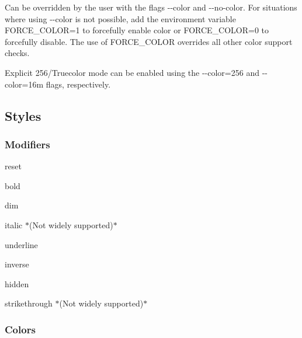 Can be overridden by the user with the flags {\ttfamily -\/-\/color} and {\ttfamily -\/-\/no-\/color}. For situations where using {\ttfamily -\/-\/color} is not possible, add the environment variable {\ttfamily F\+O\+R\+C\+E\+\_\+\+C\+O\+L\+OR=1} to forcefully enable color or {\ttfamily F\+O\+R\+C\+E\+\_\+\+C\+O\+L\+OR=0} to forcefully disable. The use of {\ttfamily F\+O\+R\+C\+E\+\_\+\+C\+O\+L\+OR} overrides all other color support checks.

Explicit 256/\+Truecolor mode can be enabled using the {\ttfamily -\/-\/color=256} and {\ttfamily -\/-\/color=16m} flags, respectively.

\subsection*{Styles}

\subsubsection*{Modifiers}


\begin{DoxyItemize}
\item {\ttfamily reset}
\item {\ttfamily bold}
\item {\ttfamily dim}
\item {\ttfamily italic} $\ast$(Not widely supported)$\ast$
\item {\ttfamily underline}
\item {\ttfamily inverse}
\item {\ttfamily hidden}
\item {\ttfamily strikethrough} $\ast$(Not widely supported)$\ast$
\end{DoxyItemize}

\subsubsection*{Colors}


